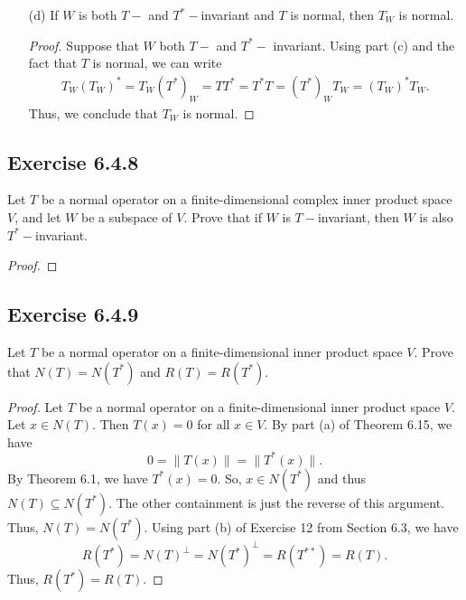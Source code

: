 \begin{enumerate}
\begin{proof}
        \[  ({T}_{W})^{*} = T^{*}(x) = (T^{*})_W (x). \]
        Thus, we conclude that \( ({T}_{W})^{*} = (T^{*})_W   \).
        \end{proof}
    \item[(d)] If \( W  \) is both \( T- \) and \( T^{*}-  \)invariant and \( T  \) is normal, then \( {T}_{W} \) is normal.
        \begin{proof}
        Suppose that \( W  \) both \( T- \) and \( T^{*}- \) invariant. Using part (c) and the fact that \( T  \) is normal, we can write
        \begin{align*}
            {T}_{W} ({T}_{W})^{*} = {T}_{W} (T^{*})_W = T T^{*} = T^{*}T = (T^{*})_W {T}_{W} = ({T}_{W})^{*} {T}_{W}.
        \end{align*}
        Thus, we conclude that \( {T}_{W} \) is normal.
\end{proof}
\end{enumerate}

\subsection*{Exercise 6.4.8} Let \( T  \) be a normal operator on a finite-dimensional complex inner product space \( V  \), and let \( W  \) be a subspace of \( V  \). Prove that if \( W  \) is \( T- \)invariant, then \( W  \) is also \( T^{*}- \)invariant.

\begin{proof}

\end{proof}

\subsection*{Exercise 6.4.9} Let \( T  \) be a normal operator on a finite-dimensional inner product space \( V  \). Prove that \( N(T) = N(T^{*}) \) and \( R(T) = R(T^{*}) \).

\begin{proof}
Let \( T  \) be a normal operator on a finite-dimensional inner product space \( V  \). Let \( x \in N(T)  \). Then \( T(x) = 0  \) for all \( x \in V  \). By part (a) of Theorem 6.15, we have
\[  0 = \|T(x)\| = \|T^{*}(x)\|. \]
By Theorem 6.1, we have \( T^{*}(x) =0  \). So, \( x \in N (T^{*}) \) and thus \( N(T) \subseteq N(T^{*}) \). The other containment is just the reverse of this argument. Thus, \( N(T) = N(T^{*}) \). Using part (b) of Exercise 12 from Section 6.3, we have 
\[  R(T^{*}) = N(T)^{\perp} = N(T^{*})^{\perp} = R(T^{**}) = R(T). \]
Thus, \( R(T^{*}) = R(T) \).
\end{proof}


